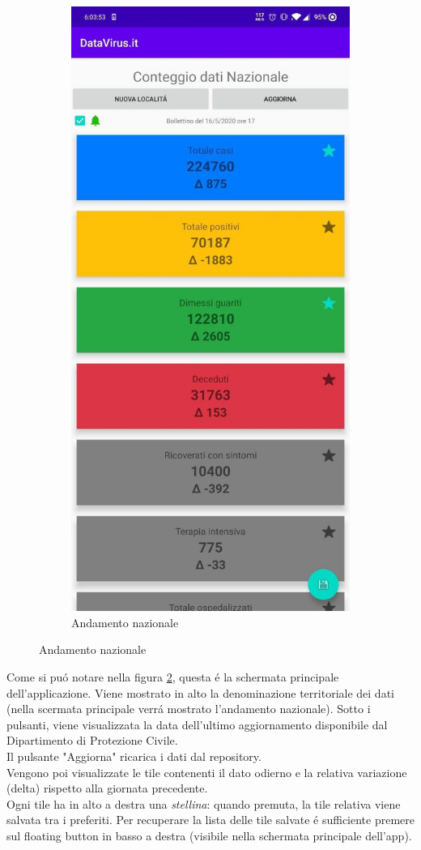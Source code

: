 \documentclass{article}
\begin{document}
\begin{figure}[h]
\begin{subfigure}{.5\textwidth}
          \includegraphics[width=.7\linewidth]{main_activity.jpg}
          \caption{Andamento nazionale}
          \label{fig1:sub2}
        \end{subfigure}
    \end{figure}
    
    Come si puó notare nella figura \ref{fig1:sub2}, questa é la schermata principale dell'applicazione. 
    Viene mostrato in alto la denominazione territoriale dei dati (nella scermata principale verrá mostrato l'andamento nazionale). Sotto i pulsanti, viene visualizzata la data dell'ultimo aggiornamento disponibile dal Dipartimento di Protezione Civile.
    \\
    Il pulsante "Aggiorna" ricarica i dati dal repository.
    \\
    Vengono poi visualizzate le tile contenenti il dato odierno e la relativa variazione (delta) rispetto alla giornata precedente.
    \\
    Ogni tile ha in alto a destra una \emph{stellina}: quando premuta, la tile relativa viene salvata tra i preferiti.
    Per recuperare la lista delle tile salvate é sufficiente premere sul floating button in basso a destra (visibile nella schermata principale dell'app).
\end{document}
